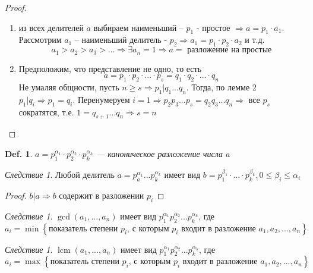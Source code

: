 \documentclass[12pt]{article}
\newenvironment{MyList}[1][4pt]{
  \begin{enumerate}[1.]
  \setlength{\parskip}{0pt}
  \setlength{\itemsep}{#1}
}{       
  \end{enumerate}
}
\DeclareMathOperator{\lcm}{lcm}
\def\SO{\Rightarrow}     %
\def\Pagebreak{\pagebreak\vspace*{-1.5em}}
\theoremstyle{definition} %
\theoremstyle{plain} %
\newtheorem{Def}[Thm]{Def.} %
\theoremstyle{remark} %
\newtheorem{Cons}[Thm]{Следствие} %
\begin{document}
\begin{proof}
    \begin{MyList}
        \item из всех делителей $a$ выбираем наименьший -- $p_1$ - простое $\SO a = p_1 \cdot a_1$.
        Рассмотрим $a_1$ -- наименьший делитель - $p_2 \SO a_1 = p_1 \cdot p_2 \cdot a_2$ и т.д. 
        \[a_1 > a_2 > a_3 > ... \SO \exists a_n = 1 \SO a = \text{ разложение на простые}\]
        
        \item Предположим, что представление не одно, то есть 
        \[a = p_1 \cdot p_2 \cdot ... \cdot p_s = q_1 \cdot q_2 \cdot ... \cdot q_n\]
        Не умаляя общности, пусть $n \geqslant s \SO p_1 | q_1 ... q_n$. Тогда, по лемме 2 $p_1 | q_i \SO p_1 = q_i$.
        Перенумеруем $i = 1 \SO p_2 p_3 ... p_s = q_2 q_3 ... q_n \SO$ все $p_s$ сократятся, т.е. $1 = q_{s + 1} ... q_n \SO s = n$     
    \end{MyList}
\end{proof}

\begin{Def}
    $a = p_1^{\alpha_1} \cdot p_2^{\alpha_2} \cdot p_k^{\alpha_k}$ --- каноническое разложение числа $a$ 
\end{Def}

\begin{Cons}
    Любой делитель $a = p_a^{\alpha_1} ... p_k^{\alpha_k}$ имеет вид $b = p_1^{\beta_1} \cdot ... \cdot p_k^{\beta_k}, 0 \leqslant \beta_i \leqslant \alpha_i$  
\end{Cons}

\begin{proof}
    $b | a \SO b$ содержит в разложении $p_i$  
\end{proof}

\Pagebreak
\begin{Cons}
    $\gcd (a_1, ..., a_n)$ имеет вид $p_1^{\alpha_1} p_2^{\alpha_2} ... p_k^{\alpha_k}$, где \\
    $a_i = \min \left\{\text{показатель степени $p_i$, с которым $p_i$ входит в разложение } a_1, a_2, ..., a_n\right\}$   
\end{Cons}

\begin{Cons}
    $\lcm (a_1, ..., a_n)$ имеет вид $p_1^{\alpha_1} p_2^{\alpha_2} ... p_k^{\alpha_k}$, где \\
    $a_i = \max \left\{\text{показатель степени $p_i$, с которым $p_i$ входит в разложение } a_1, a_2, ..., a_n\right\}$   
\end{Cons}
\end{document}
